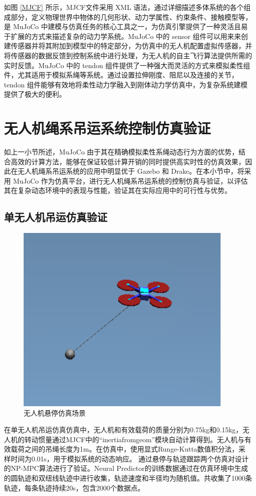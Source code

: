 \documentclass[lang=chs, degree=master, blindreview=false, winfonts=true]{yanputhesis}
\begin{document}
如图 \ref{MJCF} 所示，MJCF文件采用 XML 语法，通过详细描述多体系统的各个组成部分，定义物理世界中物体的几何形状、动力学属性、约束条件、接触模型等，是 MuJoCo 中建模与仿真任务的核心工具之一，为仿真引擎提供了一种灵活且易于扩展的方式来描述复杂的动力学系统。MuJoCo 中的 sensor 组件可以用来来创建传感器并将其附加到模型中的特定部分，为仿真中的无人机配置虚拟传感器，并将传感器的数据反馈到控制系统中进行处理，为无人机的自主飞行算法提供所需的实时反馈。MuJoCo 中的 tendon 组件提供了一种强大而灵活的方式来模拟柔性组件，尤其适用于模拟系绳等系统。通过设置拉伸刚度、阻尼以及连接的关节，tendon 组件能够有效地将柔性动力学融入到刚体动力学仿真中，为复杂系统建模提供了极大的便利。


\section{无人机绳系吊运系统控制仿真验证}
如上一小节所述，MuJoCo 由于其在精确模拟柔性系绳动态行为方面的优势，结合高效的计算方法，能够在保证较低计算开销的同时提供高实时性的仿真效果，因此在无人机绳系吊运系统的应用中明显优于 Gazebo 和 Drake。在本小节中，将采用 MuJoCo 作为仿真平台，进行无人机绳系吊运系统的控制仿真与验证，以评估其在复杂动态环境中的表现与性能，验证其在实际应用中的可行性与优势。

\subsection{单无人机吊运仿真验证}

\begin{figure}[hbt!]
	\centering
	\includegraphics[width=25pc]{picture/kk/xuanting.png} 
	\caption{无人机悬停仿真场景} 
	\label{xuanting}
\end{figure}
在单无人机吊运仿真仿真中，无人机和有效载荷的质量分别为0.75kg和0.15kg，无人机的转动惯量通过MJCF中的“inertiafromgeom”模块自动计算得到。无人机与有效载荷之间的吊绳长度为1m。在仿真中，使用显式Runge-Kutta数值积分法，采样时间为0.01s，用于模拟系统的动态响应。
通过悬停与轨迹跟踪两个仿真对设计的NP-MPC算法进行了验证。Neural Predictor的训练数据通过在仿真环境中生成的圆轨迹和双纽线轨迹中进行收集，轨迹速度和半径均为随机值。共收集了1000条轨迹，每条轨迹持续20s，包含2000个数据点。
\end{document}
